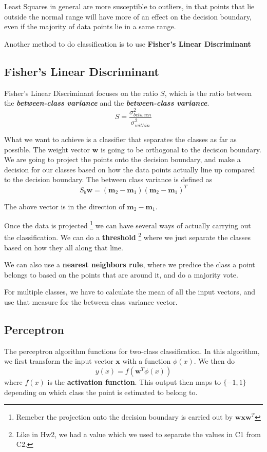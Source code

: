 \documentclass{tufte-handout}
\renewcommand{\vec}[1]{\mathbf{#1}}
\begin{document}
	Least Squares in general are more susceptible to outliers, in that points that lie outside the normal range
	will have more of an effect on the decision boundary, even if the majority of data points lie in a same
	range.

	Another method to do classification is to use \textbf{Fisher's Linear Discriminant}

\subsection{Fisher's Linear Discriminant}
Fisher's Linear Discriminant focuses on the ratio $S$, which is the ratio between the 
\textit{\textbf{between-class variance}} and the \textit{\textbf{between-class variance}}.
		\begin{equation}
		S = \frac{\sigma^{2}_{between}}{\sigma^{2}_{within}}
		\end{equation}

What we want to achieve is a classifier that separates the classes as far as possible.
The weight vector $\vec{w}$ is going to be orthogonal to the decision boundary. 
We are going to project the points onto the decision boundary, and make a decision for our classes based on 
	how the data points actually line up compared to the decision boundary.
The between class variance is defined as 
\[S_{b}\vec{w} = (\vec{m}_{2}-\vec{m}_{1})(\vec{m}_{2}-\vec{m}_{1})^{T}\]

The above vector is in the direction of $\vec{m}_{2}-\vec{m}_{1}$.

Once the data is projected
\footnote{Remeber the projection onto the decision boundary is carried out by $\vec{w}\vec{x}\vec{w}^{T}$}
we can have several ways of actually carrying out the classification. 
We can do a \textbf{threshold}
\footnote{Like in Hw2, we had a value which we used to separate the values in C1 from C2.}
where we just separate the classes based on how they all along that line.

We can also use a \textbf{nearest neighbors rule}, where we predice the class a point belongs to based on 
	the points that are around it, and do a majority vote.

For multiple classes, we have to calculate the mean of all the input vectors, and use that measure for the
	between class variance vector.

\subsection{Perceptron}
The perceptron algorithm functions for two-class classification.
In this algorithm, we first transform the input vector $\vec{x}$ with a function $\phi(x)$. 
We then do
\[ y(x)=f(\vec{w}^{T}\phi(x))\]
where $f(x)$ is the \textbf{activation function}.
This output then maps to $\{-1, 1\}$ depending on which class the point is estimated to belong to.
\end{document}
